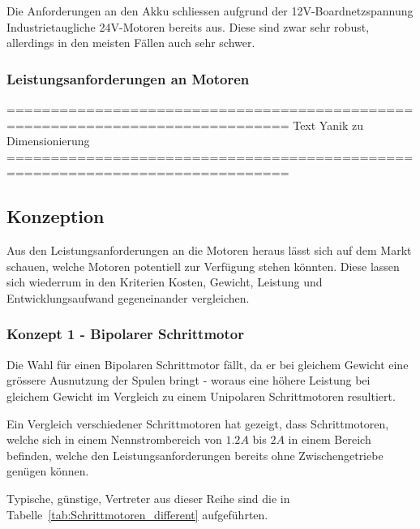 \documentclass[main.tex]{subfiles} %
\begin{document}
Die Anforderungen an den Akku schliessen aufgrund der 12V-Boardnetzspannung
Industrietaugliche 24V-Motoren bereits aus. Diese sind zwar sehr robust,
allerdings in den meisten Fällen auch sehr schwer.

\subsubsection{Leistungsanforderungen an Motoren}

==============================================================================
Text Yanik zu Dimensionierung
==============================================================================

\subsection{Konzeption}

Aus den Leistungsanforderungen an die Motoren heraus lässt sich auf dem Markt
schauen, welche Motoren potentiell zur Verfügung stehen könnten. Diese lassen
sich wiederrum in den Kriterien Kosten, Gewicht, Leistung und
Entwicklungsaufwand gegeneinander vergleichen.

\subsubsection{Konzept 1 - Bipolarer Schrittmotor} %

Die Wahl für einen Bipolaren Schrittmotor fällt, da er bei gleichem Gewicht
eine grössere Ausnutzung der Spulen bringt - woraus eine höhere Leistung bei
gleichem Gewicht im Vergleich zu einem Unipolaren Schrittmotoren resultiert.

Ein Vergleich verschiedener Schrittmotoren hat gezeigt, dass Schrittmotoren,
welche sich in einem Nennstrombereich von $1.2A$ bis $2A$ in einem Bereich
befinden, welche den Leistungsanforderungen bereits ohne Zwischengetriebe
genügen können.

Typische, günstige, Vertreter aus dieser Reihe sind die in
Tabelle~\ref{tab:Schrittmotoren_different} aufgeführten.
\end{document}

